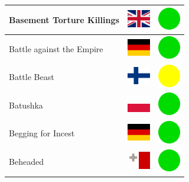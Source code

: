 \documentclass[12pt, a4paper, twoside]{report}
\begin{document}
\begin{center}
\begin{longtable}{|p{5cm}|p{2cm}|p{2cm}|}
 Basement Torture Killings                                  & \includegraphics[width=1cm]{4x3/gb} &   \includegraphics[width=1cm]{likes/y} \\ \hline
 Battle against the Empire                                  & \includegraphics[width=1cm]{4x3/de} &   \includegraphics[width=1cm]{likes/y} \\ \hline
 Battle Beast                                               & \includegraphics[width=1cm]{4x3/fi} &   \includegraphics[width=1cm]{likes/m} \\ \hline
 Batushka                                                   & \includegraphics[width=1cm]{4x3/pl} &   \includegraphics[width=1cm]{likes/y} \\ \hline
 Begging for Incest                                         & \includegraphics[width=1cm]{4x3/de} &   \includegraphics[width=1cm]{likes/y} \\ \hline
 Beheaded                                                   & \includegraphics[width=1cm]{4x3/mt} &   \includegraphics[width=1cm]{likes/y} \\ \hline

\end{longtable}
\end{center}
\end{document}
